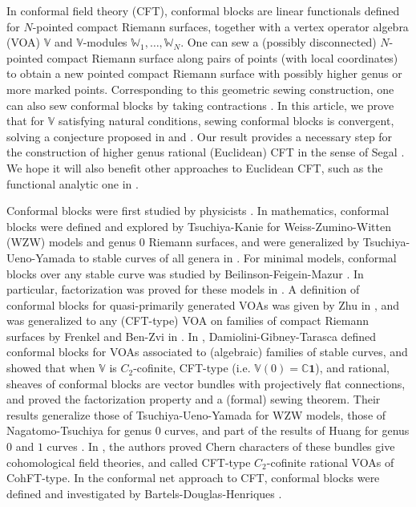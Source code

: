 \documentclass[12pt,a4paper,notitlepage]{article}
\theoremstyle{definition}
\theoremstyle{plain}
\newcommand{\id}{\mathbf{1}}
\newcommand{\Vbb}{\mathbb V}
\newcommand{\Wbb}{\mathbb W}
\newcommand{\Cbb}{\mathbb C}
\numberwithin{equation}{section}
\begin{document}
In conformal field theory (CFT), conformal blocks are linear functionals defined for $N$-pointed compact Riemann surfaces, together with a vertex operator algebra (VOA) $\Vbb$ and $\Vbb$-modules $\Wbb_1,\dots,\Wbb_N$. One can sew a (possibly disconnected) $N$-pointed compact Riemann surface along pairs of points (with local coordinates) to obtain a new pointed compact Riemann surface with possibly higher genus or more marked points. Corresponding to this geometric sewing construction, one can also sew conformal blocks by taking contractions \cite{Seg88,Vafa87,TK88,TUY89,BFM91,Zhu94,Hua97,Hua05a,Hua05b,NT05,Hua16,DGT19b}. In this article, we prove that for $\Vbb$ satisfying natural conditions,  sewing conformal blocks is convergent, solving a conjecture  proposed in \cite[Conj. 8.1]{Zhu94} and \cite[Problem 2.2]{Hua16}. Our result provides a necessary step for the construction of higher genus rational (Euclidean) CFT in the sense of Segal \cite{Seg88}. We hope it will also benefit other approaches to Euclidean CFT, such as the functional analytic one in \cite{Ten17,Ten19a,Ten19b,Ten19c}.


Conformal blocks were first studied by physicists \cite{BPZ84,FS87,MS89}. In mathematics, conformal blocks were defined and explored by Tsuchiya-Kanie \cite{TK88} for  Weiss-Zumino-Witten (WZW) models and genus $0$ Riemann surfaces, and were generalized by Tsuchiya-Ueno-Yamada to stable curves of all genera in \cite{TUY89}. For minimal models, conformal blocks over any stable curve was studied by  Beilinson-Feigein-Mazur \cite{BFM91}. In particular, factorization was proved for these models in \cite{TUY89,BFM91}.   A definition of conformal blocks for quasi-primarily generated VOAs was given by Zhu in \cite{Zhu94}, and was generalized to any (CFT-type) VOA on families of compact Riemann surfaces by Frenkel and Ben-Zvi in \cite{FB04}. In \cite{DGT19a,DGT19b}, Damiolini-Gibney-Tarasca defined conformal blocks for VOAs associated to (algebraic) families of stable curves, and showed that when $\Vbb$ is $C_2$-cofinite, CFT-type (i.e. $\Vbb(0)=\Cbb\id$), and rational,  sheaves of conformal blocks are vector bundles with projectively flat connections, and proved the factorization property and a (formal) sewing theorem. Their results generalize those of Tsuchiya-Ueno-Yamada \cite{TUY89} for WZW models, those of Nagatomo-Tsuchiya \cite{NT05} for genus $0$ curves, and part of the results of Huang for genus $0$ and $1$ curves \cite{Hua95,Hua05a,Hua05b}. In \cite{DGT19c}, the authors proved Chern characters of these bundles give cohomological field theories, and called CFT-type $C_2$-cofinite rational VOAs of CohFT-type. In the conformal net approach to CFT, conformal blocks were defined and investigated by Bartels-Douglas-Henriques \cite{BDH17}.
\end{document}
